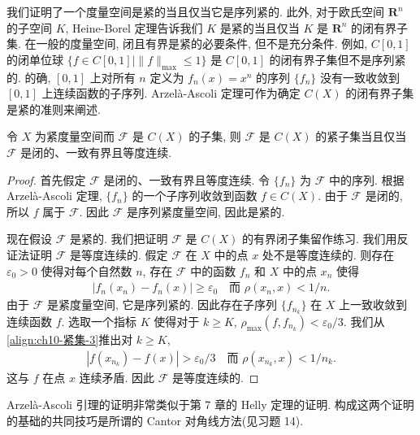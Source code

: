 \documentclass[../../main.tex]{subfiles}
\begin{document}
我们证明了一个度量空间是紧的当且仅当它是序列紧的. 此外, 对于欧氏空间 $\mathbf{R}^{n}$ 的子空间 $K$, Heine-Borel 定理告诉我们 $K$ 是紧的当且仅当 $K$ 是 $\mathbf{R}^{n}$ 的闭有界子集. 在一般的度量空间, 闭且有界是紧的必要条件, 但不是充分条件. 例如, $C[0,1]$ 的闭单位球 $\{f\in C[0,1]\mid\|f\|_{\max}\leqslant 1\}$ 是 $C[0,1]$ 的闭有界子集但不是序列紧的. 的确, $[0,1]$ 上对所有 $n$ 定义为 $f_{n}(x)=x^{n}$ 的序列 $\{f_{n}\}$ 没有一致收敛到 $[0,1]$ 上连续函数的子序列. Arzel\`a-Ascoli 定理可作为确定 $C(X)$ 的闭有界子集是紧的准则来阐述.

\begin{theorem}\label{theorem:ch10-CX紧集准则}
令 $X$ 为紧度量空间而 $\mathcal{F}$ 是 $C(X)$ 的子集, 则 $\mathcal{F}$ 是 $C(X)$ 的紧子集当且仅当 $\mathcal{F}$ 是闭的、一致有界且等度连续.
\end{theorem}

\begin{proof}
首先假定 $\mathcal{F}$ 是闭的、一致有界且等度连续. 令 $\{f_{n}\}$ 为 $\mathcal{F}$ 中的序列. 根据 Arzel\`a-Ascoli 定理, $\{f_{n}\}$ 的一个子序列收敛到函数 $f\in C(X)$. 由于 $\mathcal{F}$ 是闭的, 所以 $f$ 属于 $\mathcal{F}$. 因此 $\mathcal{F}$ 是序列紧度量空间, 因此是紧的.

现在假设 $\mathcal{F}$ 是紧的. 我们把证明 $\mathcal{F}$ 是 $C(X)$ 的有界闭子集留作练习. 我们用反证法证明 $\mathcal{F}$ 是等度连续的. 假定 $\mathcal{F}$ 在 $X$ 中的点 $x$ 处不是等度连续的. 则存在 $\varepsilon_{0}>0$ 使得对每个自然数 $n$, 存在 $\mathcal{F}$ 中的函数 $f_{n}$ 和 $X$ 中的点 $x_{n}$ 使得
\begin{align}
|f_{n}(x_{n})-f_{n}(x)|\geqslant\varepsilon_{0}\quad\text{而 }\rho(x_{n},x)<1/n.\label{align:ch10-紧集-3}
\end{align}
由于 $\mathcal{F}$ 是紧度量空间, 它是序列紧的. 因此存在子序列 $\{f_{n_{k}}\}$ 在 $X$ 上一致收敛到连续函数 $f$. 选取一个指标 $K$ 使得对于 $k\geqslant K$, $\rho_{\max}(f,f_{n_{k}})<\varepsilon_{0}/3$. 我们从\eqref{align:ch10-紧集-3}推出对 $k\geqslant K$,
\begin{align}
|f(x_{n_{k}})-f(x)|>\varepsilon_{0}/3\quad\text{而 }\rho(x_{n_{k}},x)<1/n_{k}.\label{align:ch10-紧集-4}
\end{align}
这与 $f$ 在点 $x$ 连续矛盾. 因此 $\mathcal{F}$ 是等度连续的.
\end{proof}

\begin{remark}\label{remark:ch10-arzela-注}
Arzel\`a-Ascoli 引理的证明非常类似于第 7 章的 Helly 定理的证明. 构成这两个证明的基础的共同技巧是所谓的 Cantor 对角线方法(见习题 14).
\end{remark}
\end{document}
